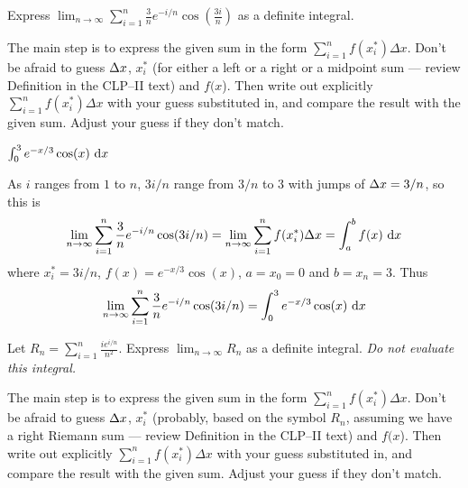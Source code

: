 \begin{question}[2016Q1]
Express $\displaystyle\lim_{n\to\infty}\displaystyle\sum_{i=1}^{n}
                       \frac{3}{n} e^{-i/n} \cos\left(\frac{3i}{n}\right)$
as a definite integral.
\end{question}

\begin{hint}
The main step is to express the given sum in the form $ \sum_{i=1}^{n} f(x_i^*)\Delta  x$.
Don't be afraid to guess $\Delta x$, $x_i^*$ (for either a left or a right or a  midpoint sum ---
review Definition   in the
CLP--II text)
and $f(x$). Then write out explicitly $ \sum_{i=1}^{n} f(x_i^*)\Delta  x$ with your guess
substituted in, and compare the result with the given sum.  Adjust your guess if they don't match.
\end{hint}

\begin{answer}
$\int_0^3 e^{-x/3}\cos(x)\,\,\mathrm{d}x$
\end{answer}

\begin{solution}
As $i$ ranges from $1$ to $n$, $3i/n$ range from $3/n$ to $3$ with jumps of
$\Delta x=3/n$, so this is
\begin{align*}
\lim_{n\to\infty}\displaystyle\sum_{i=1}^{n}
                       \frac{3}{n} e^{-i/n} \cos(3i/n)
=\lim_{n\to\infty} \sum_{i=1}^{n} f(x_i^*)\Delta  x
=\int_a^b f(x)\,\,\mathrm{d}x
\end{align*}
where $x_i^* = 3i/n$, $f(x) = e^{-x/3}\cos(x)$, $a=x_0=0$ and $b=x_n=3$. Thus
\begin{align*}
\lim_{n\to\infty}\displaystyle\sum_{i=1}^{n}
                       \frac{3}{n} e^{-i/n} \cos(3i/n)
=\int_0^3 e^{-x/3}\cos(x)\,\,\mathrm{d}x
\end{align*}

\end{solution}

\begin{question}[2012A, 2014D]
Let $\displaystyle R_n= \sum_{i=1}^{n}
                       \frac{i e^{i/n}}{n^2}$.
Express $\displaystyle\lim_{n\to\infty}R_n$
as a definite integral. \emph{Do not evaluate this integral.}
\end{question}

\begin{hint}
The main step is to express the given sum in the form
$\sum\limits_{i=1}^{n} f(x_i^*)\Delta  x$.
Don't be afraid to guess $\Delta x$, $x_i^*$ (probably, based on the symbol $R_n$,
assuming we have a right Riemann sum ---
review Definition   in the CLP--II text)
and $f(x$). Then write out explicitly $ \sum\limits_{i=1}^{n} f(x_i^*)\Delta  x$ with
your guess substituted in, and compare the result with the given sum.
Adjust your guess if they don't match.
\end{hint}

